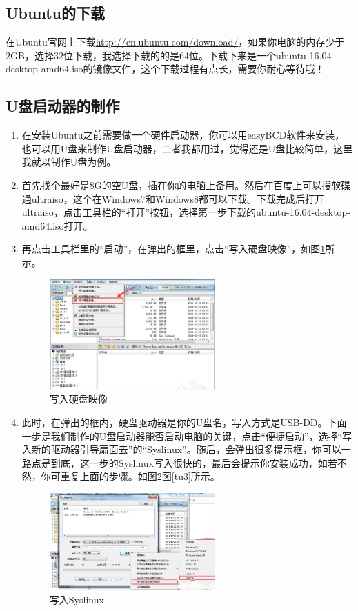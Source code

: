 \documentclass{article}
\begin{document}
\subsection{Ubuntu的下载}

  在Ubuntu官网上下载\url{http://cn.ubuntu.com/download/}，如果你电脑的内存少于2GB，选择32位下载，我选择下载的的是64位。下载下来是一个ubuntu-16.04-desktop-amd64.iso的镜像文件，这个下载过程有点长，需要你耐心等待哦！

\subsection{U盘启动器的制作}
\begin{enumerate}
\item 在安装Ubuntu之前需要做一个硬件启动器，你可以用easyBCD软件来安装，也可以用U盘来制作U盘启动器，二者我都用过，觉得还是U盘比较简单，这里我就以制作U盘为例。

\item 首先找个最好是8G的空U盘，插在你的电脑上备用。然后在百度上可以搜软碟通ultraiso，这个在Windows7和Windows8都可以下载。下载完成后打开ultraiso，点击工具栏的“打开”按钮，选择第一步下载的ubuntu-16.04-desktop-amd64.iso打开。

\item 再点击工具栏里的“启动”，在弹出的框里，点击“写入硬盘映像”，如图\ref{tu1}所示。
\begin{figure}[!htb] %
\centering
\includegraphics[width=0.6\textwidth]{tu1.jpeg}
\caption{\small 写入硬盘映像}
\label{tu1}
\end{figure}  

\item 此时，在弹出的框内，硬盘驱动器是你的U盘名，写入方式是USB-DD。下面一步是我们制作的U盘启动器能否启动电脑的关键，点击“便捷启动”，选择“写入新的驱动器引导扇面去”的“Syslinux”。随后，会弹出很多提示框，你可以一路点是到底，这一步的Syslinux写入很快的，最后会提示你安装成功，如若不然，你可重复上面的步骤。如图\ref{tu2}图\ref{tu3}所示。
\begin{figure}[!htb] %
\centering
\includegraphics[width=0.6\textwidth]{tu2.jpeg}
\caption{\small 写入Syslinux}
\label{tu2}
\end{figure}  


\end{enumerate}
\end{document}
